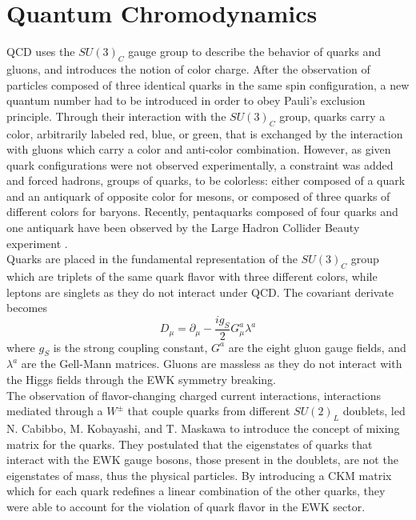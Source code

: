   \section{Quantum Chromodynamics}

    QCD uses the $ SU(3)_C $ gauge group to describe the behavior of quarks and gluons, and introduces the notion of color charge. After the observation of particles composed of three identical quarks in the same spin configuration, a new quantum number had to be introduced in order to obey Pauli's exclusion principle. Through their interaction with the $ SU(3)_C $ group, quarks carry a color, arbitrarily labeled red, blue, or green, that is exchanged by the interaction with gluons which carry a color and anti-color combination. However, as given quark configurations were not observed experimentally, a constraint was added and forced hadrons, groups of quarks, to be colorless: either composed of a quark and an antiquark of opposite color for mesons, or composed of three quarks of different colors for baryons. Recently, pentaquarks composed of four quarks and one antiquark have been observed by the Large Hadron Collider Beauty experiment \cite{Aaij:2015tga}. \\

    Quarks are placed in the fundamental representation of the $ SU(3)_C $ group which are triplets of the same quark flavor with three different colors, while leptons are singlets as they do not interact under QCD. The covariant derivate becomes
    \begin{equation}
      D_\mu = \partial_\mu - \frac{i g_S}{2} G^a_\mu \lambda^a
    \end{equation}
    where $ g_S $ is the strong coupling constant, $ G^a $ are the eight gluon gauge fields, and $ \lambda^a $ are the Gell-Mann matrices. Gluons are massless as they do not interact with the Higgs fields through the EWK symmetry breaking. \\

    The observation of flavor-changing charged current interactions, interactions mediated through a $ W^\pm $ that couple quarks from different $ SU(2)_L $ doublets, led N. Cabibbo, M. Kobayashi, and T. Maskawa to introduce the concept of mixing matrix for the quarks. They postulated that the eigenstates of quarks that interact with the EWK gauge bosons, those present in the doublets, are not the eigenstates of mass, thus the physical particles. By introducing a CKM matrix which for each quark redefines a linear combination of the other quarks, they were able to account for the violation of quark flavor in the EWK sector.


